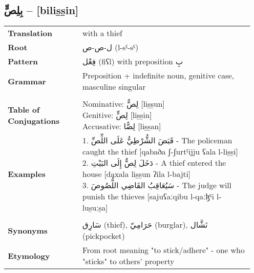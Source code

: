 \documentclass[letter,12pt]{article}
\begin{document}
\subsection{\textarabic{بِلِصٍّ} – [bilis̱s̱in]}
\begin{tabular}{p{3cm}p{10cm}}
\toprule
\textbf{Translation} & with a thief \\
\textbf{Root} & \textarabic{ل-ص-ص} (l-sˤ-sˤ) \\
\textbf{Pattern} & \textarabic{فِعْل} (fiʕl) with preposition \textarabic{بِ} \\
\textbf{Grammar} & Preposition + indefinite noun, genitive case, masculine singular \\
\midrule \\
\textbf{Table of Conjugations} & \makecell[l]{
Nominative: \textarabic{لِصٌّ} [lis̱s̱un] \\
Genitive: \textarabic{لِصٍّ} [lis̱s̱in] \\
Accusative: \textarabic{لِصًّا} [lis̱s̱an]
} \\
\midrule
\textbf{Examples} & \makecell[l]{\parbox{9.5cm}{
1. \textarabic{قَبَضَ الشُّرْطِيُّ عَلَى اللِّصِّ} - The policeman caught the thief [qabaða ʃ-ʃurtˤijju ʕala l-lis̱s̱i]\\
2. \textarabic{دَخَلَ لِصٌّ إِلَى البَيْتِ} - A thief entered the house [daxala lis̱s̱un ʔila l-bajti]\\
3. \textarabic{سَيُعَاقِبُ القَاضِي اللُّصُوصَ} - The judge will punish the thieves [sajuʕaːqibu l-qaːɮˤi l-lus̱uːs̱a]
}} \\
\midrule \\
\textbf{Synonyms} & \textarabic{سَارِق} (thief), \textarabic{حَرَامِيّ} (burglar), \textarabic{نَشَّال} (pickpocket) \\
\textbf{Etymology} & From root meaning "to stick/adhere" - one who "sticks" to others' property \\
\bottomrule
\end{tabular}
\end{document}

